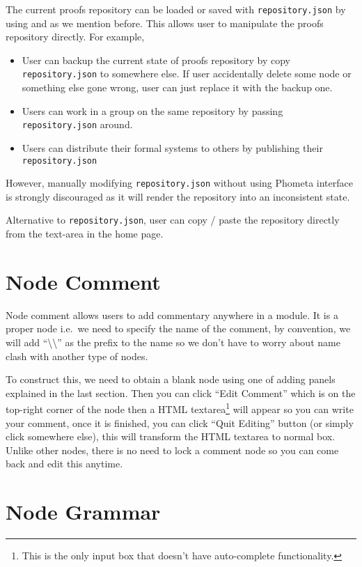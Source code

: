 \documentclass[master.tex]{subfiles}
\begin{document}
The current proofs repository can be loaded or saved with
\texttt{repository.json} by using  and  as we
mention before. This allows user to manipulate the proofs repository directly.
For example,
\begin{itemize}
\item User can backup the current state of proofs repository by copy
  \texttt{repository.json} to somewhere else. If user accidentally delete some node
  or something else gone wrong, user can just replace it with the backup one.
\item Users can work in a group on the same repository by passing
  \texttt{repository.json} around.
\item Users can distribute their formal systems to others by publishing their
  \texttt{repository.json}
\end{itemize}
However, manually modifying \texttt{repository.json} without using Phometa
interface is strongly discouraged as it will render the repository into an
inconsistent state.

Alternative to \texttt{repository.json}, user can copy / paste the repository
directly from the text-area in the home page.

\section{Node Comment}

Node comment allows users to add commentary anywhere in a module. It is a proper
node i.e.\ we need to specify the name of the comment, by convention, we will
add ``\textbackslash\textbackslash'' as the prefix to the name so we don't have
to worry about name clash with another type of nodes.

To construct this, we need to obtain a blank node using one of adding panels
explained in the last section. Then you can click ``Edit Comment'' which is on
the top-right corner of the node then a HTML textarea\footnote{This is the only
  input box that doesn't have auto-complete functionality.} will appear so you can
write your comment, once it is finished, you can click ``Quit Editing'' button
(or simply click somewhere else), this will transform the HTML textarea to
normal box. Unlike other nodes, there is no need to lock a comment node so you
can come back and edit this anytime.

\section{Node Grammar}
\label{spec:node_grammar}
\end{document}
